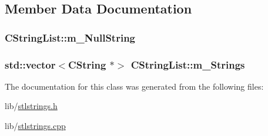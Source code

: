 \subsection{Member Data Documentation}
\hypertarget{classCStringList_a26d8e40b767037a4314894ebe1fcf2b0}{
\subsubsection[{m\-\_\-\-Null\-String}]{ C\-String\-List\-::m\-\_\-\-Null\-String\hspace{0.3cm}{\ttfamily [protected]}}}\label{classCStringList_a26d8e40b767037a4314894ebe1fcf2b0}
\hypertarget{classCStringList_a60e983669566a41d76a98122b7e9e7af}{
\subsubsection[{m\-\_\-\-Strings}]{\setlength{\rightskip}{0pt plus 5cm}std\-::vector$<${\bf C\-String} $\ast$$>$ C\-String\-List\-::m\-\_\-\-Strings\hspace{0.3cm}{\ttfamily [protected]}}}\label{classCStringList_a60e983669566a41d76a98122b7e9e7af}


The documentation for this class was generated from the following files\-:\begin{DoxyCompactItemize}
\item 
lib/\hyperlink{stlstrings_8h}{stlstrings.\-h}\item 
lib/\hyperlink{stlstrings_8cpp}{stlstrings.\-cpp}\end{DoxyCompactItemize}

